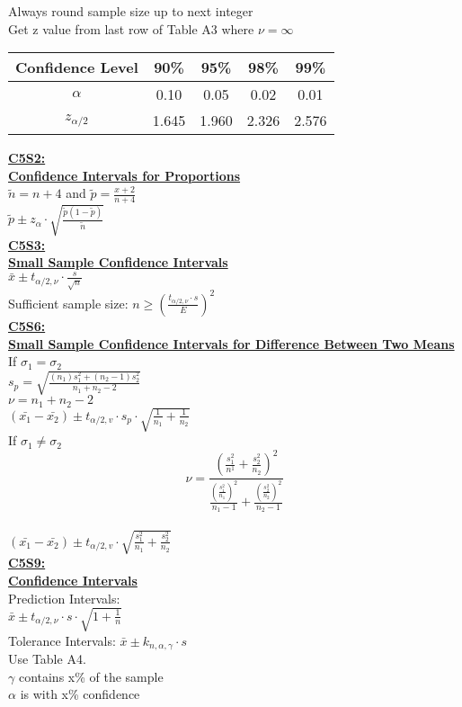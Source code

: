 \documentclass[letter, 12pt]{article}
\begin{document}
\begin{multicols}{2}
Always round sample size up to next integer\\
Get z value from last row of Table A3 where \(\nu = \infty\)\\
\begin{tabular}{c|cccc}
Confidence Level & 90\%  & 95\%  & 98\%  & 99\%  \\ \hline
\(\alpha\)           & 0.10  & 0.05  & 0.02  & 0.01  \\ \hline
\(z_{\alpha/2}\)  & 1.645 & 1.960 & 2.326 & 2.576
\end{tabular}
\textbf{\uline{C5S2:}}\\
\textbf{\uline{Confidence Intervals for Proportions}}\\
\(\tilde{n} = n+4\) and \(\tilde{p} = \frac{x+2}{n+4}\)\\
\(\tilde{p} \pm z_{\alpha}\cdot\sqrt{\frac{\tilde{p}(1-\tilde{p})}{\tilde{n}}}\)\\
\textbf{\uline{C5S3:}}\\
\textbf{\uline{Small Sample Confidence Intervals}}\\
\(\bar{x} \pm t_{\alpha/2, \nu}\cdot\frac{s}{\sqrt{n}}\)\\
Sufficient sample size: \(n \geq (\frac{t_{\alpha/2, \nu}\cdot s}{E})^2\)\\

\textbf{\uline{C5S6:}}\\
\textbf{\uline{Small Sample Confidence Intervals for Difference Between Two Means}}\\
If \(\sigma_1 = \sigma_2\)\\
\(s_p = \sqrt{\frac{(n_1)s^2_1+(n_2-1)s^2_2}{n_1+n_2-2}}\)\\
\(\nu = n_1+n_2-2\)\\
\((\bar{x_1}-\bar{x_2})\pm t_{\alpha/2,v}\cdot s_p\cdot\sqrt{\frac{1}{n_1}+\frac{1}{n_2}}\)\\
If \(\sigma_1 \neq \sigma_2\)\\
\[\nu = \frac{(\frac{s^2_1}{n^1}+\frac{s^2_2}{n_2})^2}{\frac{(\frac{s^2_1}{n_1})^2}{n_1-1}+\frac{(\frac{s^2_2}{n_2})^2}{n_2-1}}\]\\
\((\bar{x_1}-\bar{x_2})\pm t_{\alpha/2,v}\cdot\sqrt{\frac{s_1^2}{n_1}+\frac{s^2_2}{n_2}}\)\\
\textbf{\uline{C5S9:}}\\
\textbf{\uline{Confidence Intervals}}\\
Prediction Intervals:\\
\(\bar{x}\pm t_{\alpha/2, \nu}\cdot s \cdot \sqrt{1+\frac{1}{n}}\)\\
Tolerance Intervals:
\(\bar{x} \pm k_{n, \alpha, \gamma} \cdot s\)\\
Use Table A4.\\
\(\gamma\) contains x\% of the sample\\
\(\alpha\) is with x\% confidence\\
\end{multicols}
\end{document}
